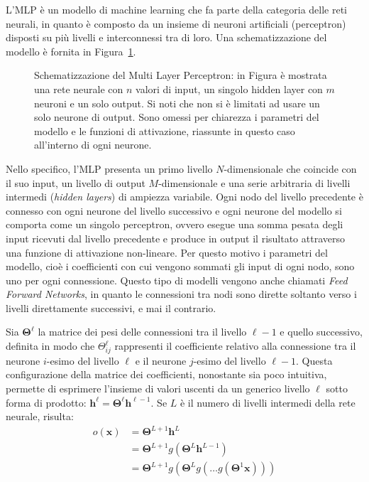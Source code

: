 L'MLP è un modello di machine learning che fa parte della categoria delle reti
neurali, in quanto è composto da un insieme di neuroni artificiali
(perceptron) disposti su più livelli e interconnessi tra di loro. Una
schematizzazione del modello è fornita in Figura~\ref{fig:mlp}.
\begin{figure}[H]
  \caption{Schematizzazione del Multi Layer Perceptron: in Figura è mostrata
    una rete neurale con $n$ valori di input, un singolo hidden layer con $m$
    neuroni e un solo output. Si noti che non si è limitati ad usare un solo
    neurone di output. Sono omessi per chiarezza i parametri del modello e le
    funzioni di attivazione, riassunte in questo caso all'interno di ogni
    neurone.%
  }%
  \label{fig:mlp}
\end{figure}
Nello specifico, l'MLP presenta un primo livello $N$-dimensionale che coincide con il
suo input, un livello di output $M$-dimensionale e una serie arbitraria di
livelli intermedi (\emph{hidden layers}) di ampiezza variabile. Ogni nodo del
livello precedente è connesso con ogni neurone del livello successivo e ogni
neurone del modello si comporta come un singolo perceptron, ovvero esegue una
somma pesata degli input ricevuti dal livello precedente e produce in output il
risultato attraverso una funzione di attivazione non-lineare. Per questo motivo
i parametri del modello, cioè i coefficienti con cui vengono sommati gli input
di ogni nodo, sono uno per ogni connessione. Questo tipo di modelli vengono
anche chiamati \emph{Feed Forward Networks}, in quanto le connessioni tra nodi
sono dirette soltanto verso i livelli direttamente successivi, e mai il
contrario.

Sia $\bm \Theta^\ell$ la matrice dei pesi delle connessioni tra il livello
$\ell-1$ e quello successivo, definita in modo che $ \Theta^\ell_{ij} $
rappresenti il coefficiente relativo alla connessione tra il neurone $i$-esimo
del livello $\ell$ e il neurone $j$-esimo del livello $\ell-1$. Questa
configurazione della matrice dei coefficienti, nonostante sia poco intuitiva,
permette di esprimere l'insieme di valori uscenti da un generico livello $\ell$
sotto forma di prodotto: $ \bm h^\ell = \bm \Theta^\ell \bm h^{\ell-1}$. Se
$L$ è il numero di livelli intermedi della rete neurale, risulta:
\begin{align*}
  o(\bm x) &= \bm \Theta^{L+1} \bm h^L \\
  &= \bm \Theta^{L+1} g( \bm \Theta^L \bm h^{L-1}) \\
  &= \bm \Theta^{L+1} g(\bm \Theta^L g(\dots g(\bm \Theta^1 \bm x)))
\end{align*}
